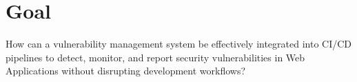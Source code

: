 \section{Goal}

How can a vulnerability management system be effectively integrated into CI/CD pipelines to detect, monitor, and report security vulnerabilities in Web Applications without disrupting development workflows?



